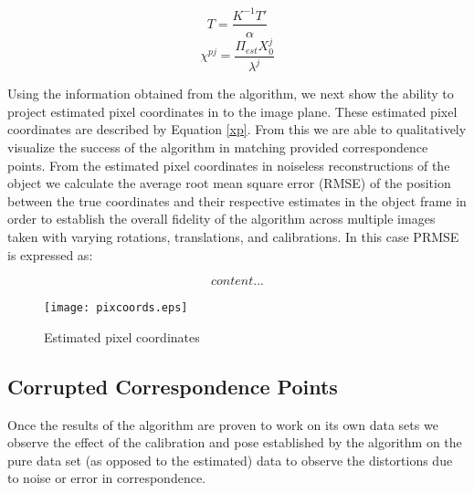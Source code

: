 \documentclass[12pt]{article}
\begin{document}
\begin{multicols}{2}
	\begin{equation}\label{Teq}
		T = \dfrac{K^{-1}T'}{\alpha}
	\end{equation}\break
	\begin{equation}\label{xp}
		\chi^{pj} = \dfrac{\Pi_{est} X_0^j}{\lambda^j}
	\end{equation}\break
\end{multicols}

Using the information obtained from the algorithm, we next show the ability to project estimated pixel coordinates in to the image plane. These estimated pixel coordinates are described by Equation \ref{xp}.  From this we are able to qualitatively visualize the success of the algorithm in matching provided correspondence points. From the estimated pixel coordinates in noiseless reconstructions of the object we calculate the average root mean square error (RMSE) of the position between the true coordinates and their respective estimates in the object frame in order to establish the overall fidelity of the algorithm across multiple images taken with varying rotations, translations, and calibrations. In this case PRMSE is expressed as:

\begin{equation}
	content...
\end{equation}



\begin{figure}
	\centering %
	\texttt{[image: pixcoords.eps]}
	\caption{Estimated pixel coordinates} \label{pixcoords} 
\end{figure}




\subsection{Corrupted Correspondence Points}
 Once the results of the algorithm are proven to work on its own data sets we observe the effect of the calibration and pose established by the algorithm on the pure data set (as opposed to the estimated) data to observe the distortions due to noise or error in correspondence. 
\end{document}
